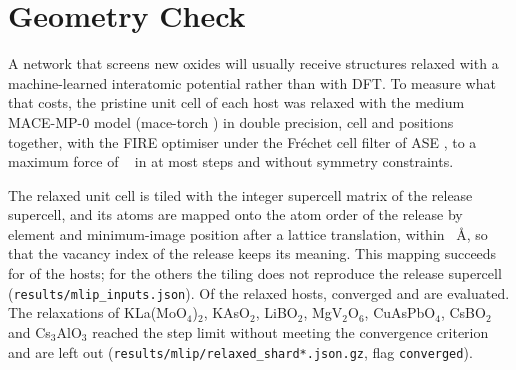\section{Geometry Check}
\label{app:geometry}

A network that screens new oxides will usually receive structures relaxed with a machine-learned interatomic potential rather than with DFT. To measure what that costs, the pristine unit cell of each host was relaxed with the medium MACE-MP-0 model \citep{Batatia2025foundation} (mace-torch \vermace{}) in double precision, cell and positions together, with the FIRE optimiser \citep{Bitzek2006structural} under the Fr\'echet cell filter of ASE \citep{HjorthLarsen2017atomic}, to a maximum force of \numCfgMlipRelaxFmaxEVPerA{}~\evperang{} in at most \numCfgMlipRelaxMaxSteps{} steps and without symmetry constraints.

The relaxed unit cell is tiled with the integer supercell matrix of the release supercell, and its atoms are mapped onto the atom order of the release by element and minimum-image position after a lattice translation, within \numMlipInputsMatchTolA{}~\AA{}, so that the vacancy index of the release keeps its meaning. This mapping succeeds for \numMlipInputsNMapped{} of the \numMlipInputsNHosts{} hosts; for the others the tiling does not reproduce the release supercell (\texttt{results/mlip\_inputs.json}). Of the \numNetGeomRelaxedHosts{} relaxed hosts, \numNetGeomEvaluatedHosts{} converged and are evaluated. The relaxations of KLa(MoO$_4$)$_2$, KAsO$_2$, LiBO$_2$, MgV$_2$O$_6$, CuAsPbO$_4$, CsBO$_2$ and Cs$_3$AlO$_3$ reached the step limit without meeting the convergence criterion and are left out (\texttt{results/mlip/relaxed\_shard*.json.gz}, flag \texttt{converged}).


